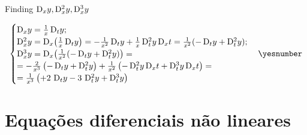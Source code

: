 \documentclass["AM3C-Slides_annotations.tex"]{subfiles}
\begin{document}
\begin{exampleBox}
  Finding \(
    \mdif[1]{x}{y},
    \mdif[2]{x}{y},
    \mdif[3]{x}{y}
  \)
  \begin{tcolorbox}
    \begin{gather*}
      \begin{cases}
        \mdif[1]{x}{y}
        = \frac{1}{x}\mdif[1]{t}{y}
        ; \\
        \mdif[2]{x}{y}
        = \mdif[1]{x}{\left(
            \frac{1}{x}\mdif[1]{t}{y}
        \right)}
        =
        - \frac{1}{x^2}\mdif[1]{t}{y}
        + \frac{1}{x}\mdif[2]{t}{y}\mdif[1]{x}{t}
        =
        \frac{1}{x^2}(
          - \mdif[1]{t}{y}
          + \mdif[2]{t}{y}
        )
        ; \\
        \mdif[3]{x}{y}
        = \mdif[1]{x}{\left(
          \frac{1}{x^2}(
            - \mdif[1]{t}{y}
            + \mdif[2]{t}{y}
          )
        \right)}
        = \\
        =
        - \frac{2}{x^3}\left(
          - \mdif[1]{t}{y}
          + \mdif[2]{t}{y}
        \right)
        + \frac{1}{x^2}\left(
          - \mdif[2]{t}{y}\mdif[1]{x}{t}
          + \mdif[3]{t}{y}\mdif[1]{x}{t}
        \right)
        = \\
        = \frac{1}{x^3}\left(
          + 2\,\mdif[1]{t}{y}
          - 3\,\mdif[2]{t}{y}
          + \mdif[3]{t}{y}
        \right)
      \end{cases}
      \yesnumber\label{eq:e.19 D123x(y)}
    \end{gather*}
  \end{tcolorbox}

\end{exampleBox}

\part*{Equações diferenciais não lineares}
\end{document}
